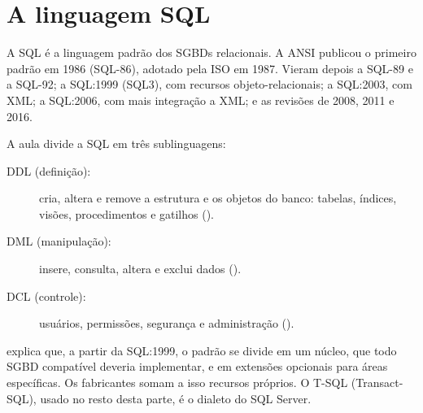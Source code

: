 \section{A linguagem SQL}

A SQL é a linguagem padrão dos SGBDs relacionais. A ANSI
publicou o primeiro padrão em 1986 (SQL-86), adotado pela ISO em 1987.
Vieram depois a SQL-89 e a SQL-92; a SQL:1999 (SQL3), com recursos
objeto-relacionais; a SQL:2003, com XML; a SQL:2006, com mais integração
a XML; e as revisões de 2008, 2011 e 2016.

A aula divide a SQL em três sublinguagens:

\begin{description}
	\item[DDL (definição):] cria, altera e remove a estrutura e os
	objetos do banco: tabelas, índices, visões, procedimentos e gatilhos
	().
	\item[DML (manipulação):] insere, consulta, altera e exclui dados
	().
	\item[DCL (controle):] usuários, permissões, segurança e
	administração ().
\end{description}

\textcite[cap. 4]{Elmasri2011} explica que, a partir da SQL:1999, o
padrão se divide em um núcleo, que todo SGBD compatível deveria
implementar, e em extensões opcionais para áreas específicas. Os
fabricantes somam a isso recursos próprios. O T-SQL (Transact-SQL), usado
no resto desta parte, é o dialeto do SQL Server.
